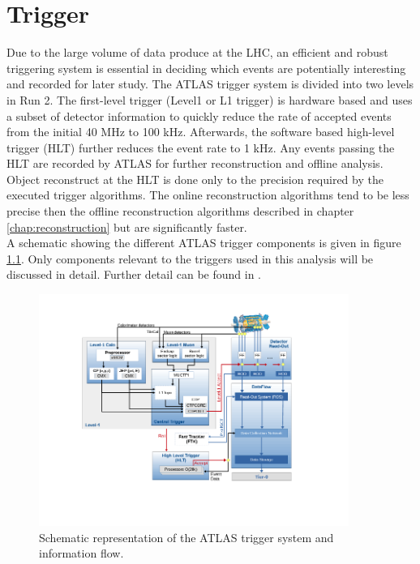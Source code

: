 \chapter{Trigger}
\label{chap:trigger}

\indent Due to the large volume of data produce at the LHC, an efficient and robust triggering system is essential in deciding which events are potentially interesting and recorded for later study.  The ATLAS trigger system is divided into two levels in Run 2.  The first-level trigger (Level1 or L1 trigger) is hardware based and uses a subset of detector information to quickly reduce the rate of accepted events from the initial 40 MHz to 100 kHz.  Afterwards, the software based high-level trigger (HLT) further reduces the event rate to 1 kHz.  Any events passing the HLT are recorded by ATLAS for further reconstruction and offline analysis. \\

\indent Object reconstruct at the HLT is done only to the precision required by the executed trigger algorithms.  The online reconstruction algorithms tend to be less precise then the offline reconstruction algorithms described in chapter \ref{chap:reconstruction} but are significantly faster. \\

\indent A schematic showing the different ATLAS trigger components is given in figure \ref{fig:trigScheme}.  Only components relevant to the triggers used in this analysis will be discussed in detail.  Further detail can be found in \cite{Trigger2015}.

\begin{figure}[h!]
  \begin{center}
    \includegraphics[width=0.90\textwidth]{figures/trigger/tdaq-schematic.png}\hspace{0.05\textwidth}
\end{center}
\caption{Schematic representation of the ATLAS trigger system and information flow.\cite{Trigger2015}}
\label{fig:trigScheme} 
\end{figure}

